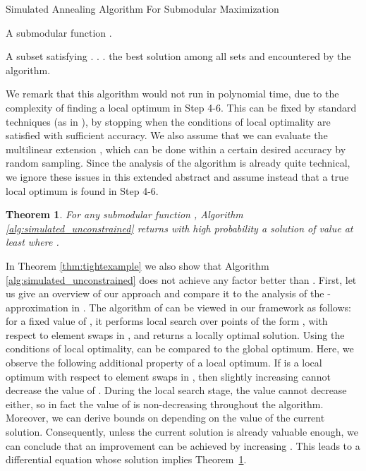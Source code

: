 \documentclass{article}[11pt]
\newcommand{\INPUT}{\item[{\bf Input:}]}
\newcommand{\OUTPUT}{\item[{\bf Output:}]}
\newtheorem{theorem}{Theorem}[section]
\begin{document}
\begin{algorithm}
\caption{Simulated Annealing Algorithm For Submodular Maximization}
\label{alg:simulated_unconstrained}
\begin{algorithmic}[1]
\INPUT A submodular function .
\OUTPUT A subset  satisfying .
 .
\STATE .
\FOR {}
\STATE   
\ENDWHILE
\ENDFOR
\RETURN the best solution among all sets  and  encountered by the algorithm.
\end{algorithmic}
\end{algorithm}


We remark that this algorithm would not run in polynomial time, due to the complexity of finding
a local optimum in Step 4-6. This can be fixed by standard techniques (as in
 \cite{FMV07,LMNS09,LSV09,Vondrak09}), by stopping when the conditions
of local optimality are satisfied with sufficient accuracy. 
We also assume that we can evaluate the multilinear extension , which can be
done within a certain desired accuracy by random sampling.
Since the analysis of the algorithm is already quite technical, we ignore these issues
in this extended abstract and assume instead that a true local optimum is found in Step 4-6.

\begin{theorem}
\label{thm:0.41-approx}
For any submodular function , Algorithm \ref{alg:simulated_unconstrained} returns with
high probability a solution of value
at least  where .
\end{theorem}
In Theorem \ref{thm:tightexample} we also show that Algorithm \ref{alg:simulated_unconstrained}
does not achieve any factor better than .
First, let us give an overview of our approach
and compare it to the analysis of the -approximation in \cite{FMV07}.
The algorithm of \cite{FMV07}
can be viewed in our framework as follows: for a fixed value of , it performs local search
over points of the form , with respect to element swaps in ,
and returns a locally optimal solution. Using the conditions of local optimality,
 can be compared to the global optimum.
Here, we observe the following additional property of a local optimum.
If  is a local optimum
with respect to element swaps in , then slightly increasing  cannot decrease the value
of . 
During the local search stage, the value cannot decrease either,
so in fact the value of  is non-decreasing throughout the algorithm.
Moreover, we can derive bounds on  depending
on the value of the current solution. Consequently,
unless the current solution is already valuable enough, we can conclude that an improvement
can be achieved by increasing .
This leads to a differential equation whose solution implies Theorem~\ref{thm:0.41-approx}.
\end{document}
